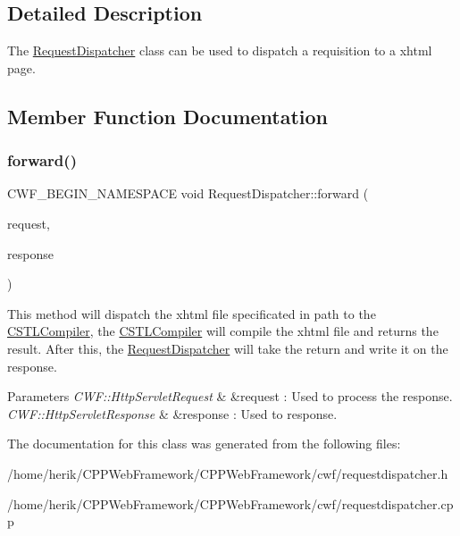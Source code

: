 \subsection{Detailed Description}
The \hyperlink{class_request_dispatcher}{Request\+Dispatcher} class can be used to dispatch a requisition to a xhtml page. 

\subsection{Member Function Documentation}
\mbox{\label{class_request_dispatcher_ad3d0b282d2c9cd0d850931167a698797}} 
\subsubsection{\texorpdfstring{forward()}{forward()}}
{\footnotesize\ttfamily C\+W\+F\+\_\+\+B\+E\+G\+I\+N\+\_\+\+N\+A\+M\+E\+S\+P\+A\+CE void Request\+Dispatcher\+::forward (\begin{DoxyParamCaption}\item[{C\+W\+F\+::\+Http\+Servlet\+Request \&}]{request,  }\item[{C\+W\+F\+::\+Http\+Servlet\+Response \&}]{response }\end{DoxyParamCaption})}



This method will dispatch the xhtml file specificated in path to the \hyperlink{class_c_s_t_l_compiler}{C\+S\+T\+L\+Compiler}, the \hyperlink{class_c_s_t_l_compiler}{C\+S\+T\+L\+Compiler} will compile the xhtml file and returns the result. After this, the \hyperlink{class_request_dispatcher}{Request\+Dispatcher} will take the return and write it on the response. 


\begin{DoxyParams}{Parameters}
{\em C\+W\+F\+::\+Http\+Servlet\+Request} & \&request \+: Used to process the response. \\
\hline
{\em C\+W\+F\+::\+Http\+Servlet\+Response} & \&response \+: Used to response. \\
\hline
\end{DoxyParams}


The documentation for this class was generated from the following files\+:\begin{DoxyCompactItemize}
\item 
/home/herik/\+C\+P\+P\+Web\+Framework/\+C\+P\+P\+Web\+Framework/cwf/requestdispatcher.\+h\item 
/home/herik/\+C\+P\+P\+Web\+Framework/\+C\+P\+P\+Web\+Framework/cwf/requestdispatcher.\+cpp\end{DoxyCompactItemize}

